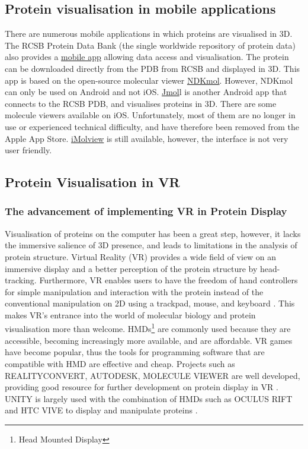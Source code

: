  \subsection{Protein visualisation in mobile applications}

There are numerous mobile applications in which proteins are visualised in 3D. The RCSB Protein Data Bank (the single worldwide repository of protein data) also provides a \href{https://www.ncbi.nlm.nih.gov/pmc/articles/PMC4271143/}{mobile app} allowing data access and visualisation. The protein can be downloaded directly from the PDB from RCSB and displayed in 3D. This app is based on the open-source molecular viewer \href{https://play.google.com/store/apps/details?id=jp.sfjp.webglmol.NDKmol&hl=en}{NDKmol}. However, NDKmol can only be used on Android and not iOS. \href{https://www.imedicalapps.com/2013/08/jmol-molecular-visualization-app/}{Jmol}l is another Android app that connects to the RCSB PDB, and visualises proteins in 3D.
There are some molecule viewers available on iOS. Unfortunately, most of them are no longer in use or experienced technical difficulty, and have therefore been removed from the Apple App Store. \href{https://www.molsoft.com/iMolview.html}{iMolview} is still available, however, the interface is not very user friendly. 


\subsection{Protein Visualisation in VR}
\subsubsection{The advancement of implementing VR in Protein Display}
Visualisation of proteins on the computer has been a great step, however, it lacks the immersive salience of 3D presence, and leads to limitations in the analysis of protein structure. Virtual Reality (VR) provides a wide field of view on an immersive display and a better perception of the protein structure by head-tracking. Furthermore, VR enables users to have the freedom of hand controllers for simple manipulation and interaction with the protein instead of the conventional manipulation on 2D using a trackpad, mouse, and keyboard \parencite{goddard_molecular_2018}. This makes VR's entrance into the world of molecular biology and protein visualisation more than welcome. 
HMDs\footnote{Head Mounted Display} are commonly used because they are accessible, becoming increasingly more available, and are affordable. VR games have become popular, thus the tools for programming software that are compatible with HMD are effective and cheap. Projects such as {\footnotesize REALITYCONVERT}, {\footnotesize AUTODESK}, {\footnotesize MOLECULE VIEWER} are well developed, providing good resource for further development on protein display in VR \parencite{ratamero_touching_2018}. {\footnotesize UNITY} is largely used with the combination of HMDs such as {\footnotesize OCULUS RIFT} and {\footnotesize HTC VIVE} to display and manipulate proteins \parencite{ratamero_touching_2018}.


